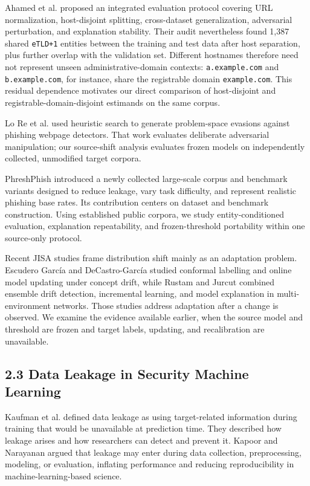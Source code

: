 \documentclass[
  10pt,
]{article}
\begin{document}
Ahamed et al.\citep{Ahamed2026} proposed an integrated evaluation
protocol covering URL normalization, host-disjoint splitting,
cross-dataset generalization, adversarial perturbation, and explanation
stability. Their audit nevertheless found 1,387 shared \texttt{eTLD+1}
entities between the training and test data after host separation, plus
further overlap with the validation set. Different hostnames therefore
need not represent unseen administrative-domain contexts:
\texttt{a.example.com} and \texttt{b.example.com}, for instance, share
the registrable domain \texttt{example.com}. This residual dependence
motivates our direct comparison of host-disjoint and
registrable-domain-disjoint estimands on the same corpus.

Lo Re et al.\citep{LoRe2026JISA} used heuristic search to generate
problem-space evasions against phishing webpage detectors. That work
evaluates deliberate adversarial manipulation; our source-shift analysis
evaluates frozen models on independently collected, unmodified target
corpora.

PhreshPhish introduced a newly collected large-scale corpus and
benchmark variants designed to reduce leakage, vary task difficulty, and
represent realistic phishing base rates\citep{Dalton2025}. Its
contribution centers on dataset and benchmark construction. Using
established public corpora, we study entity-conditioned evaluation,
explanation repeatability, and frozen-threshold portability within one
source-only protocol.

Recent JISA studies frame distribution shift mainly as an adaptation
problem. Escudero García and
DeCastro-García\citep{EscuderoGarcia2025JISA} studied conformal
labelling and online model updating under concept drift, while Rustam
and Jurcut\citep{Rustam2025JISA} combined ensemble drift detection,
incremental learning, and model explanation in multi-environment
networks. Those studies address adaptation after a change is observed.
We examine the evidence available earlier, when the source model and
threshold are frozen and target labels, updating, and recalibration are
unavailable.

\subsection{2.3 Data Leakage in Security Machine
Learning}\label{data-leakage-in-security-machine-learning}

Kaufman et al.\citep{Kaufman2012} defined data leakage as using
target-related information during training that would be unavailable at
prediction time. They described how leakage arises and how researchers
can detect and prevent it. Kapoor and Narayanan\citep{Kapoor2023} argued
that leakage may enter during data collection, preprocessing, modeling,
or evaluation, inflating performance and reducing reproducibility in
machine-learning-based science.
\end{document}
